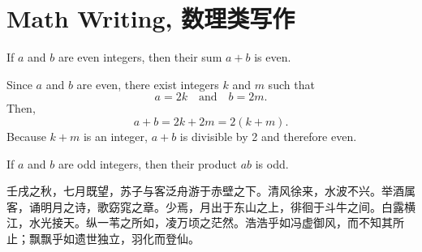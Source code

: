     \section{Math Writing, 数理类写作}
        \lipsum[1-2]
        \begin{definition}
            If \(a\) and \(b\) are even integers, then their sum \(a+b\) is even.
        \end{definition}
        \lipsum[3-4]
        \begin{lemma}
            Since \(a\) and \(b\) are even, there exist integers \(k\) and \(m\) such that 
            \[
            a = 2k \quad \text{and} \quad b = 2m.
            \]
            Then,
            \[
            a+b = 2k + 2m = 2(k+m).
            \]
            Because \(k+m\) is an integer, \(a+b\) is divisible by 2 and therefore even.
        \end{lemma}
        \lipsum[5]
        \begin{corollary}
            If \(a\) and \(b\) are odd integers, then their product \(ab\) is odd.
        \end{corollary}
        \lipsum[6-7]
        \begin{corollary}
            \lipsum[8]
        \end{corollary}
        \lipsum[10-11]
        \begin{proposition}
            壬戌之秋，七月既望，苏子与客泛舟游于赤壁之下。清风徐来，水波不兴。举酒属客，诵明月之诗，歌窈窕之章。少焉，月出于东山之上，徘徊于斗牛之间。白露横江，水光接天。纵一苇之所如，凌万顷之茫然。浩浩乎如冯虚御风，而不知其所止；飘飘乎如遗世独立，羽化而登仙。
        \end{proposition}